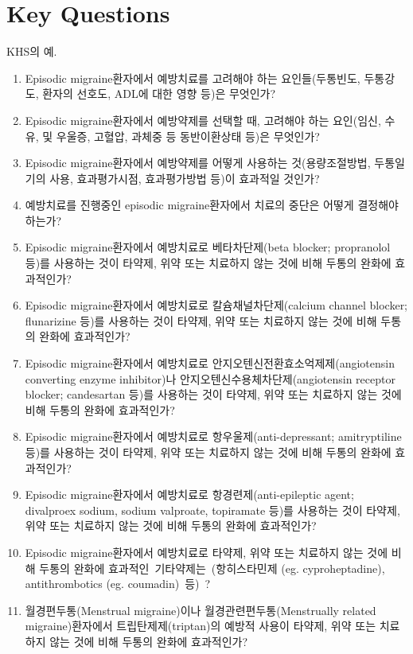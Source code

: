 \documentclass{paper}
\begin{document}
\section{Key Questions}
\color{blue}
KHS의 예.
\begin{enumerate}
	\item Episodic migraine환자에서 예방치료를 고려해야 하는 요인들(두통빈도, 두통강도, 환자의 선호도, ADL에 대한 영향 등)은 무엇인가?
	\item Episodic migraine환자에서 예방약제를 선택할 때, 고려해야 하는 요인(임신, 수유, 및 우울증, 고혈압, 과체중 등 동반이환상태 등)은 무엇인가?
	\item Episodic migraine환자에서 예방약제를 어떻게 사용하는 것(용량조절방법, 두통일기의 사용, 효과평가시점, 효과평가방법 등)이 효과적일 것인가?
	\item 예방치료를 진행중인 episodic migraine환자에서 치료의 중단은 어떻게 결정해야 하는가?
	\item Episodic migraine환자에서 예방치료로 베타차단제(beta blocker; propranolol 등)를 사용하는 것이 타약제, 위약 또는 치료하지 않는 것에 비해 두통의 완화에 효과적인가?
	\item Episodic migraine환자에서 예방치료로 칼슘채널차단제(calcium channel blocker; flunarizine 등)를 사용하는 것이 타약제, 위약 또는 치료하지 않는 것에 비해 두통의 완화에 효과적인가?
	\item Episodic migraine환자에서 예방치료로 안지오텐신전환효소억제제(angiotensin converting enzyme inhibitor)나 안지오텐신수용체차단제(angiotensin receptor blocker; candesartan 등)를 사용하는 것이 타약제, 위약 또는 치료하지 않는 것에 비해 두통의 완화에 효과적인가?
	\item Episodic migraine환자에서 예방치료로 항우울제(anti-depressant; amitryptiline 등)를 사용하는 것이 타약제, 위약 또는 치료하지 않는 것에 비해 두통의 완화에 효과적인가?
	\item Episodic migraine환자에서 예방치료로 항경련제(anti-epileptic agent; divalproex sodium, sodium valproate, topiramate 등)를 사용하는 것이 타약제, 위약 또는 치료하지 않는 것에 비해 두통의 완화에 효과적인가?
	\item Episodic migraine환자에서 예방치료로 타약제, 위약 또는 치료하지 않는 것에 비해 두통의 완화에 효과적인 기타약제는 (항히스타민제 (eg. cyproheptadine), antithrombotics (eg. coumadin) 등) ?
	\item 월경편두통(Menstrual migraine)이나 월경관련편두통(Menstrually related migraine)환자에서 트립탄제제(triptan)의 예방적 사용이 타약제, 위약 또는 치료하지 않는 것에 비해 두통의 완화에 효과적인가?
\end{enumerate}
\color{black}
\end{document}
